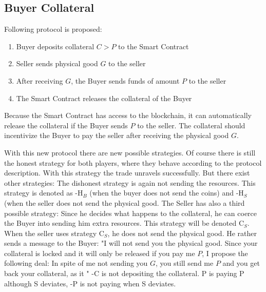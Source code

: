 \documentclass{cacthesis}
\begin{document}
\subsection{Buyer Collateral}
Following protocol is proposed:
\begin{enumerate}
    \item Buyer deposits collateral $C > P$ to the Smart Contract
    \item Seller sends physical good $G$ to the seller 
    \item After receiving $G$, the Buyer sends funds of amount $P$ to the seller 
    \item The Smart Contract releases the collateral of the Buyer
\end{enumerate}

Because the Smart Contract has access to the blockchain, it can automatically release the collateral if the Buyer sends $P$  to the seller. The collateral should incentivize the Buyer to pay the seller after receiving the physical good $G$.

With this new protocol there are new possible strategies. Of course there is still the honest strategy for both players, where they behave according to the protocol description. With this strategy the trade unravels successfully.\newline
But there exist other strategies: The dishonest strategy is again not sending the resources. This strategy is denoted as -H$_B$ (when the buyer does not send the coins) and -H$_S$ (when the seller does not send the physical good.\newline
The Seller has also a third possible strategy: Since he decides what happens to the collateral, he can coerce the Buyer into sending him extra resources. This strategy will be denoted C$_S$.  When the seller uses strategy C$_S$, he does not send the physical good. He rather sends a message to the Buyer: "I will not send you the physical good. Since your collateral is locked and it will only be released if you pay me $P$, I propose the following deal: In spite of me not sending you $G$, you still send me $P$ and you get back your collateral, as it "\newline
-C is not depositing the collateral.\newline
P is paying P although S deviates, -P is not paying when S deviates.
\end{document}
